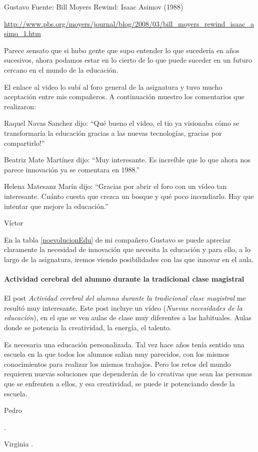 \begin{opin}{\guscolor}{Gustavo}
Fuente: Bill Moyers Rewind: Isaac Asimov (1988)

\href{http://www.pbs.org/moyers/journal/blog/2008/03/bill\_moyers\_rewind\_isaac\_asimo\_1.html}{http://www.pbs.org/moyers/journal/blog/2008/03/bill\_moyers\_rewind\_isaac\_asimo\_1.htm}

Parece sensato que si hubo gente que supo entender lo que sucedería en años sucesivos, ahora podamos estar en lo cierto de lo que puede suceder en un futuro cercano en el mundo de la educación.

El enlace al video lo subí al foro general de la asignatura y tuvo mucho aceptación entre mis compañeros. A continuación muestro los comentarios que realizaron:

Raquel Navas Sanchez dijo: “Qué bueno el video, el tio ya visionaba cómo se transformaría la educación gracias a las nuevas tecnologías, gracias por compartirlo!”

Beatriz Mate Martínez dijo: “Muy interesante. Es increíble que lo que ahora nos parece innovación ya se comentara en 1988.” 

Helena Matesanz Marín dijo: “Gracias por abrir el foro con un vídeo tan interesante.  Cuánto cuesta que crezca un bosque y qué poco incendiarlo. Hay que intentar que mejore la educación.”


\end{opin}

\begin{opin}{\victorcolor}{Víctor}

En la tabla \ref{noevolucionEdu}  de mi compañero Gustavo se puede apreciar claramente la necesidad de innovación que necesita la educación y para ello, a lo largo de la asignatura, iremos viendo posibilidades con las que innovar en el aula.

\paragraph{Actividad cerebral del alumno durante la tradicional clase magistral}

El post \textit{Actividad cerebral del alumno durante la tradicional clase magistral} me resultó muy interesante.
%
Este post incluye un vídeo (\textit{Nuevas necesidades de la educación}), en el que se ven aulas de clase muy diferentes a las habituales. 
%
Aulas donde se potencia la creatividad, la energía, el talento.

Es necesaria una educación personalizada. 
%
Tal vez hace años tenía sentido una escuela en la que todos los alumnos salían muy parecidos, con los mismos conocimientos para realizar los mismos trabajos.
%
Pero los retos del mundo requieren nuevas soluciones que dependerán de lo creativas que sean las personas que se enfrenten a ellos, y esa creatividad, se puede ir potenciando desde la escuela.


\end{opin}

\begin{opin}{\pedrocolor}{Pedro}

.


\end{opin}

\begin{opin}{\virgicolor}{Virginia}
.


\end{opin}
